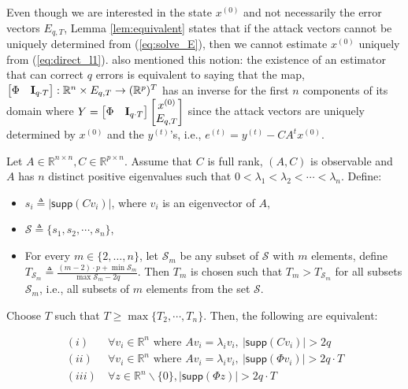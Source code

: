 \documentclass[../../thesis.tex]{subfiles}
\begin{document}
Even though we are interested in the state $x^{(0)}$ and not necessarily the error vectors $E_{q,T}$, Lemma \ref{lem:equivalent} states that if the attack vectors cannot be uniquely determined from (\ref{eq:solve_E}), then we cannot estimate $x^{(0)}$ uniquely from (\ref{eq:direct_l1}). \cite{Fawzi2014} also mentioned this notion: the existence of an estimator that can correct $q$ errors is equivalent to saying that the map, $\begin{bmatrix} \Phi & {\bf I}_{q\cdot T} \end{bmatrix}: \mathbb{R}^n \times E_{q,T} \rightarrow (\mathbb{R}^p)^T$ has an inverse for the first $n$ components of its domain where $Y = \begin{bmatrix} \Phi & {\bf I}_{q\cdot T} \end{bmatrix} \begin{bmatrix} x^{(0)} \\ E_{q,T} \end{bmatrix} $ since the attack vectors are uniquely determined by $x^{(0)}$ and the $y^{(t)}$'s, i.e., $e^{(t)} = y^{(t)} - CA ^t x^{(0)}$. 

\begin{theorem} Let $A \in \mathbb{R}^{n\times n}, C \in \mathbb{R}^{p\times n}$. Assume that $C$ is full rank, $(A,C)$ is observable and $A$ has $n$ distinct positive eigenvalues such that $0 < \lambda_1 < \lambda_2 < \cdots < \lambda_n$. 
Define:
\begin{itemize}
\item
$s_i \triangleq \lvert \textsf{supp} (Cv_i) \vert$, where $v_i$ is an eigenvector of $A$, 
\item
$\mathcal{S} \triangleq \{ s_1, s_2, \cdots, s_n \}$,
\item
For every $m \in \{2, \ldots, n\}$, let $\mathcal{S}_m$ be any subset of $\mathcal{S}$ with $m$ elements, define $T_{\mathcal{S}_m} \triangleq \frac {  (m-2) \cdot p + \min \mathcal{S}_m } {\max \mathcal{S}_m - 2q }$.
Then $T_m$ is chosen such that $T_m > T_{\mathcal{S}_m}$ for all subsets $\mathcal{S}_m$, i.e., all subsets of $m$ elements from the set $\mathcal{S}$.
\end{itemize}

Choose $T$ such that  $T \ge \max \{ T_2, \cdots, T_n \}$.
Then, the following are equivalent:

\begin{equation}
\begin{aligned} 
 (i)  &~\forall v_i \in \mathbb{R}^n \text{ where } Av_i =\lambda_i v_i, ~ \lvert \textsf{supp}(Cv_i) \rvert > 2q  \\
  (ii)  &~\forall v_i \in \mathbb{R}^n \text{ where } Av_i =\lambda_i v_i,  ~\lvert \textsf{supp} (\Phi v_i) \rvert > 2q \cdot T  \\
  (iii) &~  \forall z \in \mathbb{R}^n\backslash \{0 \}, \lvert \textsf{supp} (\Phi z) \rvert > 2 q \cdot T  \nonumber %
\label{eq:new_condition}
\end{aligned}
\end{equation}
\end{theorem}
\end{document}
